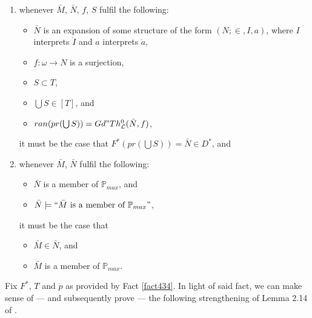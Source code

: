 \documentclass[12pt]{article}
\numberwithin{equation}{section}
\begin{document}
\begin{fact}
\begin{enumerate}[label=(4.34.\arabic*), leftmargin=50pt]
    \item\label{4346b} whenever $\bar{M}$, $\bar{N}$, $f$, $S$ fulfil the following:
    \begin{itemize}
        \item $\bar{N}$ is an expansion of some structure of the form $(N; \in, I, a)$, where $I$ interprets $\dot{I}$ and $a$ interprets $\dot{a}$,
        \item $f : \omega \longrightarrow N$ is a surjection,
        \item $S \subset T$,
        \item $\bigcup S \in [T]$, and
        \item $ran(pr(\bigcup S)) = Gd" Th^0_{\mathcal{L}}(\bar{N}, f)$,
    \end{itemize}
    it must be the case that $F^*(pr(\bigcup S)) = \bar{N} \in D^*$, and
    \item\label{4346} whenever $\bar{M}$, $\bar{N}$ fulfil the following:
    \begin{itemize}
        \item $\bar{N}$ is a member of $\mathbb{P}_{max}$, and
        \item $\bar{N} \models ``\bar{M} \text{ is a member of } \mathbb{P}_{max}"$,
    \end{itemize}
    it must be the case that
    \begin{itemize}
        \item $\bar{M} \in \bar{N}$, and
        \item $\bar{M}$ is a member of $\mathbb{P}_{max}$.
    \end{itemize}
\end{enumerate}
\end{fact}

Fix $F^*$, $T$ and $\dot{p}$ as provided by Fact \ref{fact434}. In light of said fact, we can make sense of --- and subsequently prove --- the following strengthening of Lemma 2.14 of \cite{schindler}.
\end{document}
